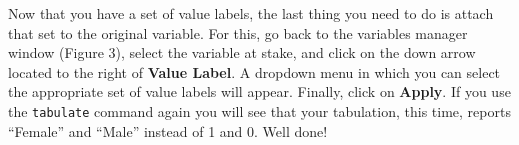 Now that you have a set of value labels, the last thing you need to do is attach that set to the original variable. For this, go back to the variables manager window (Figure 3), select the variable at stake, and click on the down arrow located to the right of \textbf{Value Label}. A dropdown menu in which you can select the appropriate set of value labels will appear. Finally, click on \textbf{Apply}. If you use the \texttt{tabulate} command again you will see that your tabulation, this time, reports ``Female'' and ``Male'' instead of 1 and 0. Well done!
